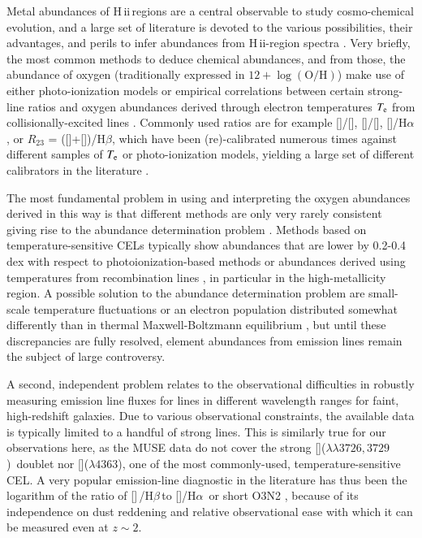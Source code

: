 \documentclass[traditabstract]{aa}
\newcommand{\hb}{H$\beta$}
\newcommand{\ha}{H$\alpha$}
\newcommand{\hii}{\mbox{H\,{\sc ii}}}
\newcommand{\oh}{$12+\log(\mathrm{O/H})$}
\newcommand{\oii}{[\ion{O}{ii}]}
\newcommand{\oiii}{[\ion{O}{iii}]}
\newcommand{\nii}{[\ion{N}{ii}]}
\begin{document}
Metal abundances of \hii\,regions are a central observable to study cosmo-chemical evolution, and a large set of literature is devoted to the various possibilities, their advantages, and perils to infer abundances from \hii-region spectra  \citep[e.g.][]{1979MNRAS.189...95P, 1991ApJ...380..140M, 2005ApJ...631..231P, 2008ApJ...681.1183K}. Very briefly, the most common methods to deduce chemical abundances, and from those, the abundance of oxygen (traditionally expressed in \oh) make use of either photo-ionization models \citep[e.g.][]{1985ApJS...58..125E, 2000ApJ...542..224D, 2002ApJS..142...35K} or empirical correlations between certain strong-line ratios and oxygen abundances derived through electron temperatures $T_{\rm{e}}$ from collisionally-excited lines \citep[CELs, e.g.][]{2004MNRAS.348L..59P, 2013A&A...559A.114M}. Commonly used ratios are for example \nii/\oii, \oiii/\nii, \nii/\ha, or $R_{23}$ = (\oii+\oiii)/\hb, which have been (re)-calibrated numerous times against different samples of $T_{\rm{e}}$ or photo-ionization models, yielding a large set of different calibrators in the literature \citep[e.g.][]{2002ApJS..142...35K, 2004ApJ...617..240K, 2005ApJ...631..231P, 2006A&A...459...85N, 2008A&A...488..463M}.

The most fundamental problem in using and interpreting the oxygen abundances derived in this way is that different methods are only very rarely consistent \citep[e.g.][]{2008ApJ...681.1183K} giving rise to the abundance determination problem \citep{1967ApJ...150..825P}. Methods based on temperature-sensitive CELs typically show abundances that are lower by 0.2-0.4 dex with respect to photoionization-based methods or abundances derived using temperatures from recombination lines \citep[e.g.][and references therein]{2012MNRAS.426.2630L}, in particular in the high-metallicity region. A possible solution to the abundance determination problem are small-scale temperature fluctuations \citep[e.g.][]{2003ApJ...584..735P, 2004MNRAS.355..229E} or an electron population distributed somewhat differently than in thermal Maxwell-Boltzmann equilibrium \citep{2012ApJ...752..148N, 2012MNRAS.426.2630L}, but until these discrepancies are fully resolved, element abundances from emission lines remain the subject of large controversy.

A second, independent problem relates to the observational difficulties in robustly measuring emission line fluxes for lines in different wavelength ranges for faint, high-redshift galaxies. Due to various observational constraints, the available data is typically limited to a handful of strong lines. This is similarly true for our observations here, as the MUSE data do not cover the strong \oii($\lambda\lambda3726,3729$)~doublet nor \oiii($\lambda 4363$), one of the most commonly-used, temperature-sensitive CEL. A very popular emission-line diagnostic in the literature has thus been the logarithm of the ratio of \oiii\,/\hb\,to \nii/\ha\, or short O3N2 \citep[e.g.][]{2004MNRAS.348L..59P, 2013A&A...559A.114M}, because of its independence on dust reddening and relative observational ease with which it can be measured even at $z\sim 2$.
\end{document}
